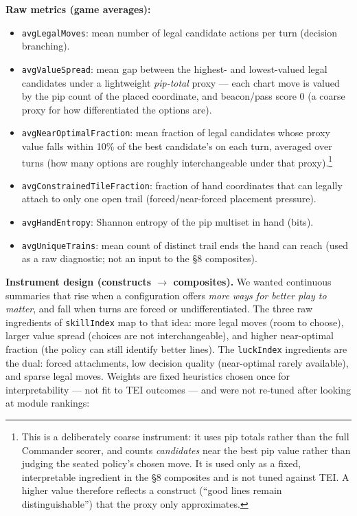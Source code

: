 \documentclass[11pt,letterpaper]{article}
\begin{document}
\textbf{Raw metrics (game averages):}
\begin{itemize}
\item \texttt{avgLegalMoves}: mean number of legal candidate actions per turn (decision branching).
\item \texttt{avgValueSpread}: mean gap between the highest- and lowest-valued legal candidates under a lightweight \emph{pip-total} proxy --- each chart move is valued by the pip count of the placed coordinate, and beacon/pass score 0 (a coarse proxy for how differentiated the options are).
\item \texttt{avgNearOptimalFraction}: mean fraction of legal candidates whose proxy value falls within 10\% of the best candidate's on each turn, averaged over turns (how many options are roughly interchangeable under that proxy).\footnote{This is a deliberately coarse instrument: it uses pip totals rather than the full Commander scorer, and counts \emph{candidates} near the best pip value rather than judging the seated policy's chosen move. It is used only as a fixed, interpretable ingredient in the \S 8 composites and is not tuned against TEI. A higher value therefore reflects a construct (``good lines remain distinguishable'') that the proxy only approximates.}
\item \texttt{avgConstrainedTileFraction}: fraction of hand coordinates that can legally attach to only one open trail (forced/near-forced placement pressure).
\item \texttt{avgHandEntropy}: Shannon entropy of the pip multiset in hand (bits).
\item \texttt{avgUniqueTrains}: mean count of distinct trail ends the hand can reach (used as a raw diagnostic; not an input to the §8 composites).
\end{itemize}

\textbf{Instrument design (constructs $\to$ composites).}
We wanted continuous summaries that rise when a configuration offers \emph{more ways for better play to matter}, and fall when turns are forced or undifferentiated. The three raw ingredients of \texttt{skillIndex} map to that idea: more legal moves (room to choose), larger value spread (choices are not interchangeable), and higher near-optimal fraction (the policy can still identify better lines). The \texttt{luckIndex} ingredients are the dual: forced attachments, low decision quality (near-optimal rarely available), and sparse legal moves. Weights are fixed heuristics chosen once for interpretability --- not fit to TEI outcomes --- and were not re-tuned after looking at module rankings:
\end{document}
